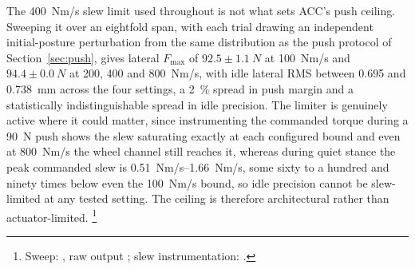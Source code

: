 \documentclass[a4paper,fleqn]{cas-dc}
\begin{document}
The \SI{400}{Nm/s} slew limit used throughout is not what sets ACC's push
ceiling. Sweeping it over an eightfold span, with each trial drawing an
independent initial-posture perturbation from the same distribution as the push
protocol of Section~\ref{sec:push}, gives lateral $F_{\max}$ of
$92.5{\pm}\SI{1.1}{N}$ at \SI{100}{Nm/s} and $94.4{\pm}\SI{0.0}{N}$ at
\SI{200}{}, \SI{400}{} and \SI{800}{Nm/s}, with idle lateral RMS between
\SI{0.695}{} and \SI{0.738}{mm} across the four settings, a \SI{2}{\percent}
spread in push margin and a statistically indistinguishable spread in idle
precision. The limiter is genuinely active where it could matter, since
instrumenting the commanded torque during a \SI{90}{N} push shows the slew
saturating exactly at each configured bound and even at \SI{800}{Nm/s} the wheel
channel still reaches it, whereas during quiet stance the peak commanded slew is
\SIrange{0.51}{1.66}{Nm/s}, some sixty to a hundred and ninety times below even
the \SI{100}{Nm/s} bound, so idle precision cannot be slew-limited at any tested
setting. The ceiling is therefore architectural rather than actuator-limited.%
\footnote{Sweep: , raw output
; slew instrumentation:
.}
\end{document}
